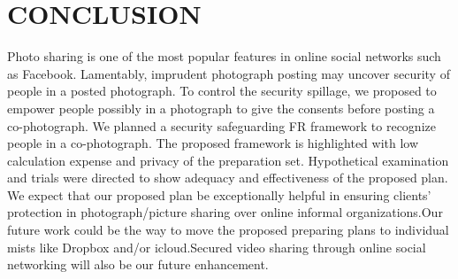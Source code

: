 
\chapter[CONCLUSION]{\fontsize{16}{12}\selectfont CONCLUSION }

Photo sharing is one of the most popular features in online social networks such as Facebook. Lamentably, imprudent photograph posting may uncover security of people in a posted photograph. To control the security spillage, we proposed to empower people possibly in a photograph to give the consents before posting a co-photograph. We planned a security safeguarding FR framework to recognize people in a co-photograph. The proposed framework is highlighted with low calculation expense and privacy of the preparation set. Hypothetical examination and trials were directed to show adequacy and effectiveness of the proposed plan. We expect that our proposed plan be exceptionally helpful in ensuring clients' protection in photograph/picture sharing over online informal organizations.Our future work could be the way to move the proposed preparing plans to individual mists like Dropbox and/or icloud.Secured video sharing through online social networking will also be our future enhancement. 

 \newpage
 \thispagestyle{empty}
 
%
